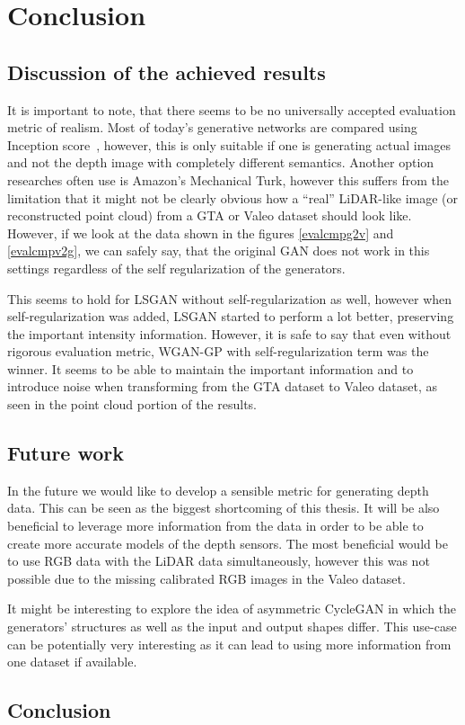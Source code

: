 \chapter{Conclusion}

\section{Discussion of the achieved results}

It is important to note, that there seems to be no universally accepted evaluation metric of realism. Most of today's generative networks are compared using Inception score~\cite{inception}, however, this is only suitable if one is generating actual images and not the depth image with completely different semantics. Another option researches often use is Amazon's Mechanical Turk, however this suffers from the limitation that it might not be clearly obvious how a ``real'' LiDAR-like image (or reconstructed point cloud) from a GTA or Valeo dataset should look like. However, if we look at the data shown in the figures \ref{evalcmpg2v} and \ref{evalcmpv2g}, we can safely say, that the original GAN does not work in this settings regardless of the self regularization of the generators.

This seems to hold for LSGAN without self-regularization as well, however when self-regularization was added, LSGAN started to perform a lot better, preserving the important intensity information. However, it is safe to say that even without rigorous evaluation metric, WGAN-GP with self-regularization term was the winner. It seems to be able to maintain the important information and to introduce noise when transforming from the GTA dataset to Valeo dataset, as seen in the point cloud portion of the results. 

\section{Future work}

In the future we would like to develop a sensible metric for generating depth data. This can be seen as the biggest shortcoming of this thesis. It will be also beneficial to leverage more information from the data in order to be able to create more accurate models of the depth sensors. The most beneficial would be to use RGB data with the LiDAR data simultaneously, however this was not possible due to the missing calibrated RGB images in the Valeo dataset.

It might be interesting to explore the idea of asymmetric CycleGAN in which the generators' structures as well as the input and output shapes differ. This use-case can be potentially very interesting as it can lead to using more information from one dataset if available.

\section{Conclusion}

